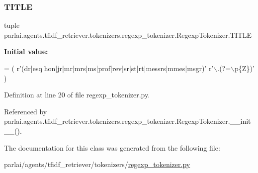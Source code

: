 \subsubsection{\texorpdfstring{T\+I\+T\+LE}{TITLE}}
{\footnotesize\ttfamily tuple parlai.\+agents.\+tfidf\+\_\+retriever.\+tokenizers.\+regexp\+\_\+tokenizer.\+Regexp\+Tokenizer.\+T\+I\+T\+LE\hspace{0.3cm}{\ttfamily [static]}}

{\bfseries Initial value\+:}
\begin{DoxyCode}
=  (
        \textcolor{stringliteral}{r'(dr|esq|hon|jr|mr|mrs|ms|prof|rev|sr|st|rt|messrs|mmes|msgr)'} \textcolor{stringliteral}{r'\(\backslash\).(?=\(\backslash\)p\{Z\})'}
    )
\end{DoxyCode}


Definition at line 20 of file regexp\+\_\+tokenizer.\+py.



Referenced by parlai.\+agents.\+tfidf\+\_\+retriever.\+tokenizers.\+regexp\+\_\+tokenizer.\+Regexp\+Tokenizer.\+\_\+\+\_\+init\+\_\+\+\_\+().



The documentation for this class was generated from the following file\+:\begin{DoxyCompactItemize}
\item 
parlai/agents/tfidf\+\_\+retriever/tokenizers/\hyperlink{regexp__tokenizer_8py}{regexp\+\_\+tokenizer.\+py}\end{DoxyCompactItemize}
